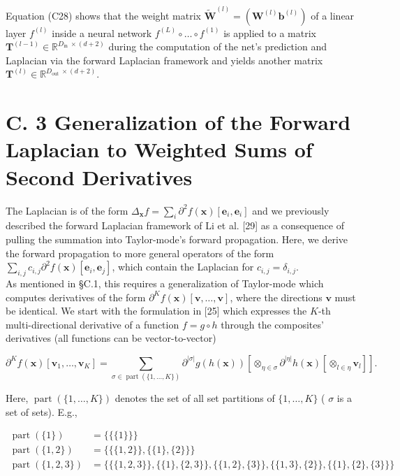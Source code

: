 \documentclass[10pt]{article}
\begin{document}
Equation (C28) shows that the weight matrix $\tilde{\boldsymbol{W}}^{(l)}=\left(\boldsymbol{W}^{(l)} \boldsymbol{b}^{(l)}\right)$ of a linear layer $f^{(l)}$ inside a neural network $f^{(L)} \circ \ldots \circ f^{(1)}$ is applied to a matrix $\boldsymbol{T}^{(l-1)} \in \mathbb{R}^{D_{\text {in }} \times(d+2)}$ during the computation of the net's prediction and Laplacian via the forward Laplacian framework and yields another matrix $\boldsymbol{T}^{(l)} \in \mathbb{R}^{D_{\text {out }} \times(d+2)}$.

\section*{C. 3 Generalization of the Forward Laplacian to Weighted Sums of Second Derivatives}
The Laplacian is of the form $\Delta_{\boldsymbol{x}} f=\sum_{i} \partial^{2} f(\boldsymbol{x})\left[\boldsymbol{e}_{i}, \boldsymbol{e}_{i}\right]$ and we previously described the forward Laplacian framework of Li et al. [29] as a consequence of pulling the summation into Taylor-mode's forward propagation. Here, we derive the forward propagation to more general operators of the form $\sum_{i, j} c_{i, j} \partial^{2} f(\boldsymbol{x})\left[\boldsymbol{e}_{i}, \boldsymbol{e}_{j}\right]$, which contain the Laplacian for $c_{i, j}=\delta_{i, j}$.\\
As mentioned in §C.1, this requires a generalization of Taylor-mode which computes derivatives of the form $\partial^{K} f(\boldsymbol{x})[\boldsymbol{v}, \ldots, \boldsymbol{v}]$, where the directions $\boldsymbol{v}$ must be identical. We start with the formulation in [25] which expresses the $K$-th multi-directional derivative of a function $f=g \circ h$ through the composites' derivatives (all functions can be vector-to-vector)


\begin{equation*}
\partial^{K} f(\boldsymbol{x})\left[\boldsymbol{v}_{1}, \ldots, \boldsymbol{v}_{K}\right]=\sum_{\sigma \in \operatorname{part}(\{1, \ldots, K\})} \partial^{|\sigma|} g(h(\boldsymbol{x}))\left[\otimes_{\eta \in \sigma} \partial^{|\eta|} h(\boldsymbol{x})\left[\otimes_{l \in \eta} \boldsymbol{v}_{l}\right]\right] . \tag{C29}
\end{equation*}


Here, $\operatorname{part}(\{1, \ldots, K\})$ denotes the set of all set partitions of $\{1, \ldots, K\}$ ( $\sigma$ is a set of sets). E.g.,

$$
\begin{aligned}
\operatorname{part}(\{1\}) & =\{\{\{1\}\}\} \\
\operatorname{part}(\{1,2\}) & =\{\{\{1,2\}\},\{\{1\},\{2\}\}\} \\
\operatorname{part}(\{1,2,3\}) & =\{\{\{1,2,3\}\},\{\{1\},\{2,3\}\},\{\{1,2\},\{3\}\},\{\{1,3\},\{2\}\},\{\{1\},\{2\},\{3\}\}\}
\end{aligned}
$$
\end{document}
